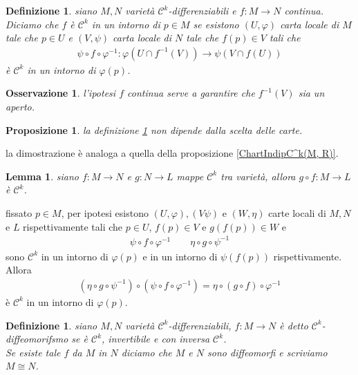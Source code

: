 \documentclass[oneside, 11pt]{amsbook}
\makeatletter
\newcommand{\C}{\mathcal{C}}
\newcommand{\vp}{\varphi}
\newcommand{\co}[1]{\textit{#1}}
\newcommand{\0}{{(0)}}
\newcommand{\3}{{(3)}}
\theoremstyle{colonplain}
\newtheorem{prop}[thm]{Proposizione}
\newtheorem{lemma}[thm]{Lemma}
\theoremstyle{colondefinition}
\newtheorem{defn}[thm]{Definizione}
\theoremstyle{colonremark}
\newtheorem{rmk}[thm]{Osservazione}
\numberwithin{equation}{chapter}
\renewcommand{\proofname}{Dimostrazione}
\renewenvironment{proof}[1][\proofname]{\par
  \pushQED{\qed}%
  \normalfont \topsep6\p@\@plus6\p@\relax
  \trivlist
  \item[\hskip\labelsep\bfseries #1:]\ignorespaces
}{%
  \popQED\endtrivlist\@endpefalse
}
\makeatother
\begin{document}
\begin{defn}\label{C^k(M, N)}
    siano $M, N$ varietà $\C^k$-differenziabili e $f : M \longrightarrow N$ continua. Diciamo che $f$ è $\C^k$ in un intorno di $p \in M$ se esistono $(U, \vp)$ carta locale di $M$ tale che $p \in U$ e $(V, \psi)$ carta locale di $N$ tale che $f(p) \in V$ tali che
    \begin{align}
        \psi \circ f \circ \vp^{-1} : \vp(U \cap f^{-1}(V)) \longrightarrow \psi(V \cap f(U))
    \end{align}
    è $\C^k$ in un intorno di $\vp(p)$.
\end{defn}
\begin{rmk}
    l'ipotesi $f$ continua serve a garantire che $f^{-1}(V)$ sia un aperto.
\end{rmk}
\begin{prop}
    la definizione \ref{C^k(M, N)} non dipende dalla scelta delle carte.
\end{prop}
\begin{proof}
    la dimostrazione è analoga a quella della proposizione \ref{ChartIndipC^k(M, R)}.
\end{proof}
\begin{lemma}
    siano $f : M \longrightarrow N$ e $g : N \longrightarrow L$ mappe $\C^k$ tra varietà, allora $g \circ f : M \longrightarrow L$ è $\C^k$.
\end{lemma}
\begin{proof}
    fissato $p \in M$, per ipotesi esistono $(U, \vp), (V \psi)$ e $(W, \eta)$ carte locali di $M, N$ e $L$ rispettivamente tali che $p \in U$, $f(p) \in V$ e $g(f(p)) \in W$ e
    \begin{align}
        \psi \circ f \circ \vp^{-1} \qquad \eta \circ g \circ \psi^{-1}
    \end{align}
    sono $\C^k$ in un intorno di $\vp(p)$ e in un intorno di $\psi(f(p))$ rispettivamente. Allora
    \begin{align}
        (\eta \circ g \circ \psi^{-1}) \circ (\psi \circ f \circ \vp^{-1}) = \eta \circ (g \circ f) \circ \vp^{-1}
    \end{align}
    è $\C^k$ in un intorno di $\vp(p)$.
\end{proof}
\begin{defn}
    siano $M, N$ varietà $\C^k$-differenziabili, $f : M \longrightarrow N$ è detto $\C^k$-\co{diffeomorifsmo} se è $\C^k$, invertibile e con inversa $\C^k$. \\
    Se esiste tale $f$ da $M$ in $N$ diciamo che $M$ e $N$ sono diffeomorfi e scriviamo $M \cong N$.
\end{defn}
\end{document}

